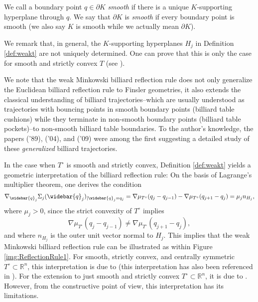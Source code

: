 \documentclass[12pt]{amsart}
\theoremstyle{plain}
\theoremstyle{remark}
\theoremstyle{definition}
\newcommand{\R}{\mathbb{R}}
\def\beqq{\begin{equation*}}\def\eeqq{\end{equation*}}
\begin{document}
We call a boundary point $q\in\partial K$ \textit{smooth} if there is a unique $K$-supporting hyperplane through $q$. We say that $\partial K$ is \textit{smooth} if every boundary point is smooth (we also say $K$ is smooth while we actually mean $\partial K$).

We remark that, in general, the $K$-supporting hyperplanes $H_j$ in Definition \ref{def:weakt} are not uniquely determined. One can prove that this is only the case for smooth and strictly convex $T$ (see \cite{KruppRudolf2022}).

We note that the weak Minkowski billiard reflection rule does not only generalize the Euclidean billiard reflection rule to Finsler geometries, it also extends the classical understanding of billiard trajectories--which are usually understood as trajectories with bouncing points in smooth boundary points (billiard table cushions) while they terminate in non-smooth boundary points (billiard table pockets)--to non-smooth billiard table boundaries. To the author's knowledge, the papers \cite{Bezdek1989} ('89), \cite{Ghomi2004} ('04), and \cite{Bezdek2011} ('09) were among the first suggesting a detailed study of these \textit{generalized} billiard trajectories.

In the case when $T^\circ$ is smooth and strictly convex, Definition \ref{def:weakt} yields a geometric interpretation of the billiard reflection rule: On the basis of Lagrange's multiplier theorem, one derives the condition
\beqq \nabla_{\widebar{q}_j}\Sigma_j(\widebar{q}_j)_{\vert \widebar{q}_j=q_j}=\nabla\mu_{T^\circ}(q_j-q_{j-1})-\nabla\mu_{T^\circ}(q_{j+1}-q_j)= \mu_j n_{H_j},\eeqq
where $\mu_j>0$, since the strict convexity of $T^\circ$ implies
\beqq \nabla\mu_{T^\circ}(q_j-q_{j-1}) \neq \nabla\mu_{T^\circ}(q_{j+1}-q_j),\eeqq
and where $n_{H_j}$ is the outer unit vector normal to $H_j$. This implies that the weak Minkowski billiard reflection rule can be illustrated as within Figure \ref{img:ReflectionRule1}. For smooth, strictly convex, and centrally symmetric $T^ \circ\subset\R^n$, this interpretation is due to \cite[Lemma 3.1, Corollary 3.2 and Lemma 3.3]{GutkinTabachnikov2002} (this interpretation has also been referenced in \cite{AlkoumiSchlenk2014}). For the extension to just smooth and strictly convex $T^\circ\subset\R^n$, it is due to \cite[Lemma 2.1]{BlagHarTabZieg2017}. However, from the constructive point of view, this interpretation has its limitations.
\end{document}
